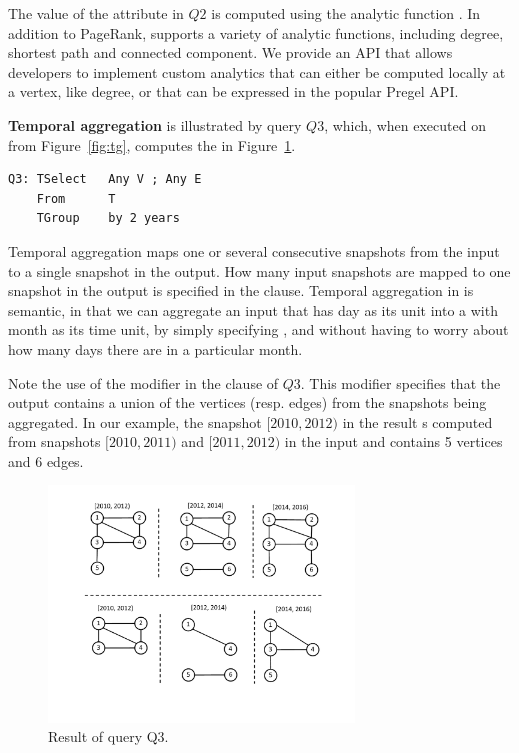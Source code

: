 The value of the attribute  in $Q2$ is computed using the
analytic function .  In addition to PageRank, \ql
supports a variety of analytic functions, including degree, shortest
path and connected component.  We provide an API that allows
developers to implement custom analytics that can either be computed
locally at a vertex, like degree, or that can be expressed in the
popular Pregel API. 

{\bf Temporal aggregation} is illustrated by query $Q3$, which, when
executed on  from Figure~\ref{fig:tg}, computes the \tg in
Figure~\ref{fig:tg_any}.

\begin{verbatim}
Q3: TSelect   Any V ; Any E 
    From      T
    TGroup    by 2 years
\end{verbatim}


Temporal aggregation maps one or several consecutive snapshots from
the input to a single snapshot in the output.  How many input
snapshots are mapped to one snapshot in the output is specified in the
 clause.  Temporal aggregation in \ql is semantic, in
that we can aggregate an input \tg that has day as its unit into a \tg
with month as its time unit, by simply specifying , and without having to worry about how many days there are in
a particular month.

Note the use of the modifier  in the  clause
of $Q3$.  This modifier specifies that the output contains a union of
the vertices (resp. edges) from the snapshots being aggregated.  In
our example, the snapshot $[2010, 2012)$ in the result s computed from
  snapshots $[2010, 2011)$ and $[2011, 2012)$ in the input and
      contains 5 vertices and 6 edges.

\begin{figure}
\includegraphics[width=3.2in]{figs/TGroupAny.pdf}
\caption{Result of query Q3.}
\label{fig:tg_any}
\end{figure}

